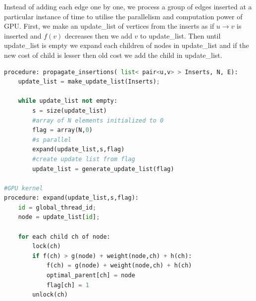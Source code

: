\documentclass[a4paper]{article}
\begin{document}
Instead of adding each edge one by one, we process a group of edges inserted at a particular instance of time to utilise the parallelism and computation power of GPU. First, we make an update\_list of vertices from the inserts as if $u \rightarrow v $ is inserted and $f(v)$ decreases then we add $v$ to update\_list. Then until update\_list is empty we expand each children of nodes in update\_list and if the new cost of child is lesser then old cost we add the child in update\_list.
\begin{lstlisting}[language=python, caption=Propagation of Insertions]
procedure: propagate_insertions( list< pair<u,v> > Inserts, N, E):
    update_list = make_update_list(Inserts);
                          
    while update_list not empty:
        s = size(update_list)
        #array of N elements initialized to 0
        flag = array(N,0)
        #s parallel
        expand(update_list,s,flag)
        #create update list from flag
        update_list = generate_update_list(flag)
        
#GPU kernel
procedure: expand(update_list,s,flag):
    id = global_thread_id;
    node = update_list[id];
    
    for each child ch of node:
        lock(ch)
        if f(ch) > g(node) + weight(node,ch) + h(ch):
            f(ch) = g(node) + weight(node,ch) + h(ch)  
            optimal_parent[ch] = node
            flag[ch] = 1
        unlock(ch)


\end{lstlisting}
\end{document}
